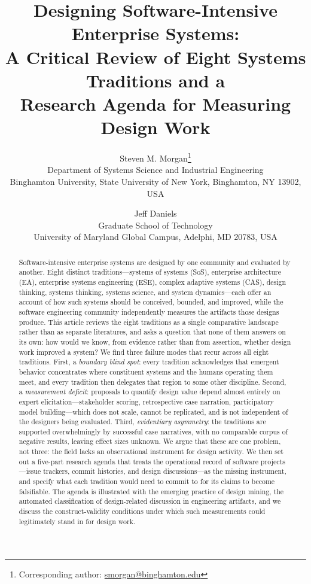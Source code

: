 \documentclass[11pt,a4paper]{article}
\title{\bfseries Designing Software-Intensive Enterprise Systems:\\
A Critical Review of Eight Systems Traditions and a\\
Research Agenda for Measuring Design Work}
\author{
Steven M. Morgan\thanks{Corresponding author: \url{smorgan@binghamton.edu}}\\
\small Department of Systems Science and Industrial Engineering\\
\small Binghamton University, State University of New York, Binghamton, NY 13902, USA
\and
Jeff Daniels\\
\small Graduate School of Technology\\
\small University of Maryland Global Campus, Adelphi, MD 20783, USA
}
\date{}
\begin{document}
\onehalfspacing
\linenumbers

\maketitle

\begin{abstract}
\noindent
Software-intensive enterprise systems are designed by one community and
evaluated by another. Eight distinct traditions---systems of systems (SoS),
enterprise architecture (EA), enterprise systems engineering (ESE), complex
adaptive systems (CAS), design thinking, systems thinking, systems science, and
system dynamics---each offer an account of how such systems should be conceived,
bounded, and improved, while the software engineering community independently
measures the artifacts those designs produce. This article reviews the eight
traditions as a single comparative landscape rather than as separate
literatures, and asks a question that none of them answers on its own: how would
we know, from evidence rather than from assertion, whether design work improved
a system? We find three failure modes that recur across all eight traditions.
First, a \emph{boundary blind spot}: every tradition acknowledges that emergent
behavior concentrates where constituent systems and the humans operating them
meet, and every tradition then delegates that region to some other discipline.
Second, a \emph{measurement deficit}: proposals to quantify design value depend
almost entirely on expert elicitation---stakeholder scoring, retrospective case
narration, participatory model building---which does not scale, cannot be
replicated, and is not independent of the designers being evaluated. Third,
\emph{evidentiary asymmetry}: the traditions are supported overwhelmingly by
successful case narratives, with no comparable corpus of negative results,
leaving effect sizes unknown. We argue that these are one problem, not three:
the field lacks an observational instrument for design activity. We then set out
a five-part research agenda that treats the operational record of software
projects---issue trackers, commit histories, and design discussions---as the
missing instrument, and specify what each tradition would need to commit to for
its claims to become falsifiable. The agenda is illustrated with the emerging
practice of design mining, the automated classification of design-related
discussion in engineering artifacts, and we discuss the construct-validity
conditions under which such measurements could legitimately stand in for design
work.
\end{abstract}
\end{document}
